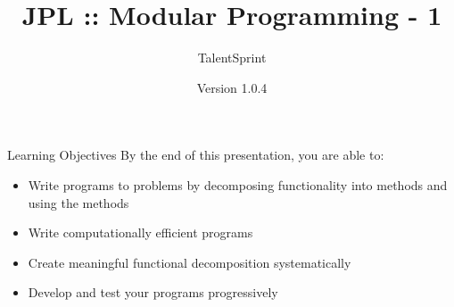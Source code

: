 \documentclass[14pt]{beamer}
\title[JPL:Java:02]{JPL :: Modular Programming - 1}
\author[TS]{TalentSprint}
\institute[L\&D]{Licensed To Skill}
\date{Version 1.0.4}
\begin{document}
\begin{frame}
  \titlepage
\end{frame}

\begin{frame}{Learning Objectives}
By the end of this presentation, you are able to:
  \begin{itemize}
  \item Write programs to problems by decomposing functionality into methods and using the methods
  \item Write computationally efficient programs
  \item Create meaningful functional decomposition systematically
  \item Develop and test your programs progressively
  \end{itemize}
\end{frame}
\end{document}
